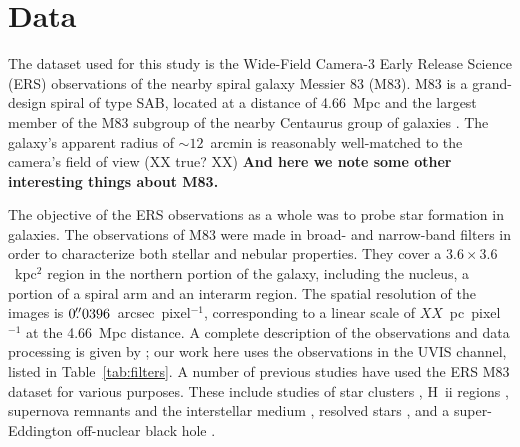 \section{Data}

The dataset used for this study is the Wide-Field Camera-3
Early Release Science (ERS) observations of the nearby spiral galaxy Messier 83 (M83).
M83 is a grand-design spiral of type SAB, located at a distance of 4.66~Mpc \citep{tully13}
and the largest member of the M83 subgroup of the nearby Centaurus group of galaxies \citep{tully15}.
The galaxy's apparent radius of $\sim12$~arcmin \citep{} is reasonably well-matched to the camera's field of view (XX true? XX)
{\bf And here we note some other interesting things about M83.}

The objective of the ERS observations as a whole was to probe star formation in galaxies.
The observations of M83 were made in broad- and narrow-band filters in order to characterize both stellar and nebular properties.
They cover a $3.6\times3.6$~kpc$^2$ region in the northern portion of the galaxy, including the nucleus,
a portion of a spiral arm and an interarm region.
The spatial resolution of the images is $0\hbox{$.\!\!^{\prime\prime}$}0396$~arcsec~pixel$^{-1}$,
corresponding to a linear scale of $XX$~pc~pixel$^{-1}$ at the 4.66~Mpc distance.
A complete description of the observations and data processing is given by \citet{chandar10};
our work here uses the observations in the UVIS channel, listed in Table~\ref{tab:filters}.
A number of previous studies have used the ERS M83 dataset for various purposes.
These include studies of 
star clusters \citep{chandar10, woffard11, whitmore11, bastian11, bastian12, fousneau12, silva13, andrews14, chandar14, adamo15,ryon15,hollyhead15, sun16},
H~{\sc ii} regions \citep{liu13}, supernova remnants and the interstellar medium \citep{dopita10, hong11, blair14, blair15}, 
resolved stars \citep{kim12, williams15},
and a super-Eddington off-nuclear black hole \citep{soria14}.


